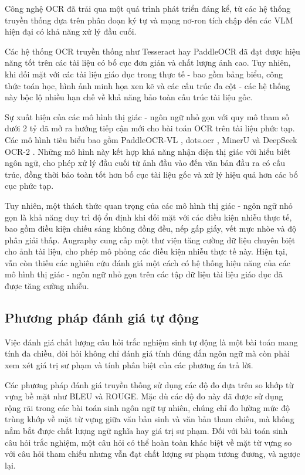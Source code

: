 Công nghệ OCR đã trải qua một quá trình phát triển đáng kể, từ các hệ thống truyền thống dựa trên phân đoạn ký tự và mạng nơ-ron tích chập đến các VLM hiện đại có khả năng xử lý đầu cuối.

Các hệ thống OCR truyền thống như Tesseract hay PaddleOCR đã đạt được hiệu năng tốt trên các tài liệu có bố cục đơn giản và chất lượng ảnh cao. Tuy nhiên, khi đối mặt với các tài liệu giáo dục trong thực tế - bao gồm bảng biểu, công thức toán học, hình ảnh minh họa xen kẽ và các cấu trúc đa cột - các hệ thống này bộc lộ nhiều hạn chế về khả năng bảo toàn cấu trúc tài liệu gốc.

Sự xuất hiện của các mô hình thị giác - ngôn ngữ nhỏ gọn với quy mô tham số dưới 2 tỷ đã mở ra hướng tiếp cận mới cho bài toán OCR trên tài liệu phức tạp. Các mô hình tiêu biểu bao gồm PaddleOCR-VL \cite{paddleocr2025}, dots.ocr \cite{dotsocr2025}, MinerU \cite{mineru2025} và DeepSeek OCR-2 \cite{deepseekocr2025}. Những mô hình này kết hợp khả năng nhận diện thị giác với hiểu biết ngôn ngữ, cho phép xử lý đầu cuối từ ảnh đầu vào đến văn bản đầu ra có cấu trúc, đồng thời bảo toàn tốt hơn bố cục tài liệu gốc và xử lý hiệu quả hơn các bố cục phức tạp.

Tuy nhiên, một thách thức quan trọng của các mô hình thị giác - ngôn ngữ nhỏ gọn là khả năng duy trì độ ổn định khi đối mặt với các điều kiện nhiễu thực tế, bao gồm điều kiện chiếu sáng không đồng đều, nếp gấp giấy, vết mực nhòe và độ phân giải thấp. Augraphy \cite{augraphy2023} cung cấp một thư viện tăng cường dữ liệu chuyên biệt cho ảnh tài liệu, cho phép mô phỏng các điều kiện nhiễu thực tế này. Hiện tại, vẫn còn thiếu các nghiên cứu đánh giá một cách có hệ thống hiệu năng của các mô hình thị giác - ngôn ngữ nhỏ gọn trên các tập dữ liệu tài liệu giáo dục đã được tăng cường nhiễu.

\subsection{Phương pháp đánh giá tự động}

Việc đánh giá chất lượng câu hỏi trắc nghiệm sinh tự động là một bài toán mang tính đa chiều, đòi hỏi không chỉ đánh giá tính đúng đắn ngôn ngữ mà còn phải xem xét giá trị sư phạm và tính phân biệt của các phương án trả lời.

Các phương pháp đánh giá truyền thống sử dụng các độ đo dựa trên so khớp từ vựng bề mặt như BLEU và ROUGE. Mặc dù các độ đo này đã được sử dụng rộng rãi trong các bài toán sinh ngôn ngữ tự nhiên, chúng chỉ đo lường mức độ trùng khớp về mặt từ vựng giữa văn bản sinh và văn bản tham chiếu, mà không nắm bắt được chất lượng ngữ nghĩa hay giá trị sư phạm. Đối với bài toán sinh câu hỏi trắc nghiệm, một câu hỏi có thể hoàn toàn khác biệt về mặt từ vựng so với câu hỏi tham chiếu nhưng vẫn đạt chất lượng sư phạm tương đương, và ngược lại.

